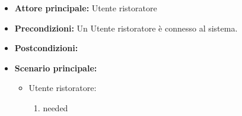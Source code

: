 \label{usecase:Chat con cliente}
\begin{itemize}
\item \textbf{Attore principale:} Utente ristoratore
\item \textbf{Precondizioni:}
Un Utente ristoratore è connesso al sistema.
\item \textbf{Postcondizioni:}
\item \textbf{Scenario principale:}
\begin{itemize}
\item Utente ristoratore:
\begin{enumerate}
\item needed
\end{enumerate}
\end{itemize}

\end{itemize}